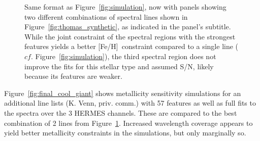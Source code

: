 \documentclass[]{aastex631}
\newcommand{\feh}{[Fe/H]\xspace}
\begin{document}
\begin{figure}


\caption{Same format as Figure~\ref{fig:simulation}, now with panels showing two different combinations of spectral lines shown in Figure~\ref{fig:thomas_synthetic}, as indicated in the panel's subtitle. While the joint constraint of the spectral regions with the strongest features yields a better \feh~constraint compared to a single line ($cf.$ Figure~\ref{fig:simulation}), the third spectral region does not improve the fits for this stellar type and assumed S/N, likely because its features are weaker.}
\label{fig:multiple_lines}
\end{figure}

Figure~\ref{fig:final_cool_giant} shows metallicity sensitivity simulations for an additional line lists (K. Venn, priv. comm.) with 57 features as well as full fits to the spectra over the 3 HERMES channels. These are compared to the best combination of 2 lines from Figure~\ref{fig:multiple_lines}. Increased wavelength coverage appears to yield better metallicity constraints in the simulations, but only marginally so. 
\end{document}
